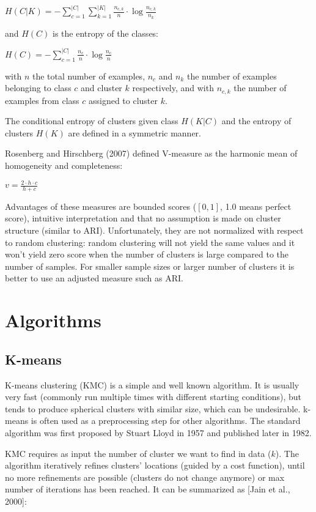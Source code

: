 \documentclass[conference]{IEEEtran}
\begin{document}
$H(C|K) = - \sum\limits_{c=1}^{|C|}\sum\limits_{k=1}^{|K|}\frac{n_{c,k}}{n}\cdot \log{\frac{n_{c,k}}{n_k}}$

and $H(C)$ is the entropy of the classes:

$H(C) = - \sum\limits_{c=1}^{|C|}\frac{n_c}{n} \cdot \log{\frac{n_c}{n}}$

with $n$ the total number of examples, $n_c$ and $n_k$ the number of examples belonging to class
$c$ and cluster $k$ respectively, and with $n_{c,k}$ the number of examples from class $c$ assigned
to cluster $k$.

The conditional entropy of clusters given class $H(K|C)$ and the entropy of clusters $H(K)$ are
defined in a symmetric manner.

Rosenberg and Hirschberg (2007) defined V-measure as the harmonic mean of homogeneity and completeness:

$v = \frac{2 \cdot h \cdot c}{h+c}$

Advantages of these measures are bounded scores ($[0, 1]$, 1.0 means perfect score), intuitive interpretation and that
no assumption is made on cluster structure (similar to ARI). Unfortunately, they are not normalized
with respect to random clustering: random clustering will not yield the same values and it won't
yield zero score when the number of clusters is large compared to the number of samples. For smaller
sample sizes or larger number of clusters it is better to use an adjusted measure such as ARI.

\section{Algorithms}
\subsection{K-means}
K-means clustering (KMC) is a simple and well known algorithm. It is usually very
fast (commonly run multiple times with different starting conditions), but tends
to produce spherical clusters with similar size, which can be undesirable.
k-means is often used as a preprocessing step for other algorithms. The standard
algorithm was first proposed by Stuart Lloyd in 1957 and published later in 1982.

KMC requires as input the number of cluster we want to find in data ($k$).
The algorithm iteratively refines clusters' locations (guided by a cost function),
until no more refinements are possible (clusters do not change anymore)
or max number of iterations has been reached. It can be summarized as [Jain et al., 2000]:
\end{document}
